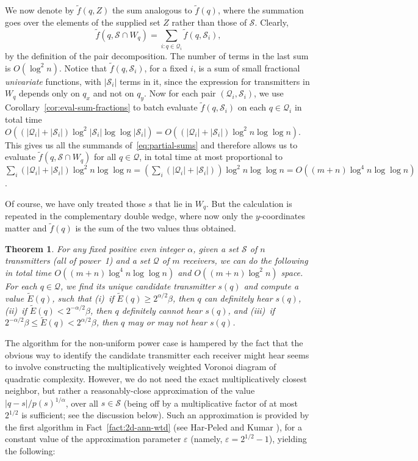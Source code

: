 \documentclass[11pt]{article}
\newtheorem{theorem}{Theorem}[section]
\theoremstyle{remark}
\def\Q{\mathcal{Q}}
\def\S{\mathcal{S}}
\def\ff{\tilde{f}}
\def\EE{\tilde{E}}
\let\eps\varepsilon
\begin{document}
We now denote by $\ff(q,Z)$ the sum analogous to $\ff(q)$, where
the summation goes over the elements of the supplied set $Z$ rather than those
of $\S$.  Clearly,
\begin{equation}
  \label{eq:partial-sums}
  \ff(q,\S \cap W_q)=\sum_{i:q \in \Q_i} \ff(q,\S_i),
\end{equation}
by the definition of the pair decomposition.  The number of terms in the
last sum is $O(\log^2 n)$.  Notice that $\ff(q,\S_i)$, for a fixed $i$,
is a sum of small fractional \emph{univariate} functions, with $|\S_i|$
terms in it, since the expression for transmitters in $W_q$ depends only on
$q_x$ and not on $q_y$.  Now for each pair $(\Q_i,\S_i)$, we use
Corollary~\ref{cor:eval-sum-fractions} to batch evaluate $\ff(q,\S_i)$ on each
$q\in \Q_i$ in total time $O((|\Q_i| + |\S_i|) \log^2 |\S_i| \log \log
|\S_i|) = O((|\Q_i| + |\S_i|) \log^2 n \log \log n)$.  This gives us all
the summands of~\eqref{eq:partial-sums} and therefore allows us to
evaluate $\ff(q, \S \cap W_q)$ for all $q \in \Q$, in total time at most
proportional to $\sum_i (|\Q_i| + |\S_i|) \log^2 n \log \log n = (\sum_i
(|\Q_i| + |\S_i|)) \log^2 n \log \log n = O((m+n)\log^4 n \log \log n)$. 

Of course, we have only treated those $s$ that lie in $W_q$.  But the calculation
is repeated in the complementary double wedge,
where now only the $y$-coordinates matter and $\ff(q)$ is the sum of the two values thus obtained.

\begin{theorem}
  \label{th:2d-general-uniform}
  For any fixed positive even integer $\alpha$, given a set $\S$ of $n$
  transmitters (all of power~1) and a set $\Q$ of $m$ receivers, we can do the following in 
  total time $O((m+n) \log^4 n \log \log n)$ and $O((m+n) \log^2 n)$ space.
For each $q \in \Q$, we find 
  its unique candidate transmitter $s(q)$ and compute a value $\EE(q)$, such that (i)~if $\EE(q) \ge 2^{\alpha/2}\beta$,
  then $q$ can definitely hear $s(q)$, (ii)~if $\EE(q) < 2^{-\alpha/2}\beta$, then $q$ definitely cannot hear $s(q)$, and 
(iii)~if $2^{-\alpha/2}\beta \le \EE(q) < 2^{\alpha/2}\beta$, then $q$ may or may not hear $s(q)$.
\end{theorem}

The algorithm for the non-uniform power case is hampered by the fact
that the obvious way to identify the candidate transmitter each
receiver might hear seems to involve constructing the multiplicatively
weighted Voronoi diagram of quadratic complexity.  However, we do not
need the exact multiplicatively closest neighbor, but rather a
reasonably-close approximation of the value
$|q-s|/p(s)^{1/\alpha}$, over all $s \in \S$ (being off by a
multiplicative factor of at most $2^{1/2}$ is sufficient; see the discussion below).
Such an approximation is provided by the first algorithm in Fact~\ref{fact:2d-ann-wtd} (see Har-Peled and Kumar \cite{wann-focs,wann}), for a constant value of the approximation parameter $\eps$ (namely, $\eps = 2^{1/2}-1$), yielding the following:
\end{document}
